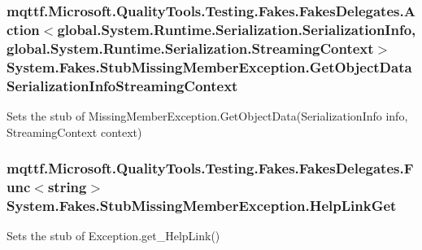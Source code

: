 \hypertarget{class_system_1_1_fakes_1_1_stub_missing_member_exception_a0387c3240f6dc90a0ccb25f23a8d5ee0}{
\subsubsection[{Get\-Object\-Data\-Serialization\-Info\-Streaming\-Context}]{\setlength{\rightskip}{0pt plus 5cm}mqttf.\-Microsoft.\-Quality\-Tools.\-Testing.\-Fakes.\-Fakes\-Delegates.\-Action$<$global.\-System.\-Runtime.\-Serialization.\-Serialization\-Info, global.\-System.\-Runtime.\-Serialization.\-Streaming\-Context$>$ System.\-Fakes.\-Stub\-Missing\-Member\-Exception.\-Get\-Object\-Data\-Serialization\-Info\-Streaming\-Context}}\label{class_system_1_1_fakes_1_1_stub_missing_member_exception_a0387c3240f6dc90a0ccb25f23a8d5ee0}


Sets the stub of Missing\-Member\-Exception.\-Get\-Object\-Data(\-Serialization\-Info info, Streaming\-Context context)

\hypertarget{class_system_1_1_fakes_1_1_stub_missing_member_exception_a46a5ff25d1b656cde3715204bbc05477}{
\subsubsection[{Help\-Link\-Get}]{\setlength{\rightskip}{0pt plus 5cm}mqttf.\-Microsoft.\-Quality\-Tools.\-Testing.\-Fakes.\-Fakes\-Delegates.\-Func$<$string$>$ System.\-Fakes.\-Stub\-Missing\-Member\-Exception.\-Help\-Link\-Get}}\label{class_system_1_1_fakes_1_1_stub_missing_member_exception_a46a5ff25d1b656cde3715204bbc05477}


Sets the stub of Exception.\-get\-\_\-\-Help\-Link()

